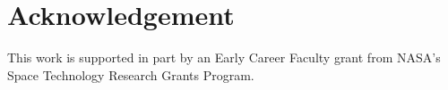 \documentclass[letterpaper, 10 pt, conference]{ieeeconf}  %
\begin{document}
\section*{Acknowledgement}
This work is supported in part by an Early Career Faculty grant from NASA’s Space Technology Research Grants Program.

\addtolength{\textheight}{-7.5cm}














\end{document}
